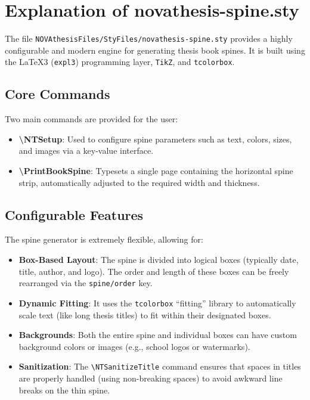 

\chapter{Explanation of novathesis-spine.sty}
\label{annex:novathesis-spine}

The file \texttt{NOVAthesisFiles/StyFiles/novathesis-spine.sty} provides a highly configurable and modern engine for generating thesis book spines. It is built using the \LaTeX3 (\texttt{expl3}) programming layer, \texttt{TikZ}, and \texttt{tcolorbox}.

\section{Core Commands}
Two main commands are provided for the user:
\begin{itemize}
    \item \textbf{\textbackslash NTSetup}: Used to configure spine parameters such as text, colors, sizes, and images via a key-value interface.
    \item \textbf{\textbackslash PrintBookSpine}: Typesets a single page containing the horizontal spine strip, automatically adjusted to the required width and thickness.
\end{itemize}

\section{Configurable Features}
The spine generator is extremely flexible, allowing for:
\begin{itemize}
    \item \textbf{Box-Based Layout}: The spine is divided into logical boxes (typically date, title, author, and logo). The order and length of these boxes can be freely rearranged via the \texttt{spine/order} key.
    \item \textbf{Dynamic Fitting}: It uses the \texttt{tcolorbox} ``fitting'' library to automatically scale text (like long thesis titles) to fit within their designated boxes.
    \item \textbf{Backgrounds}: Both the entire spine and individual boxes can have custom background colors or images (e.g., school logos or watermarks).
    \item \textbf{Sanitization}: The \texttt{\textbackslash NTSanitizeTitle} command ensures that spaces in titles are properly handled (using non-breaking spaces) to avoid awkward line breaks on the thin spine.
\end{itemize}

